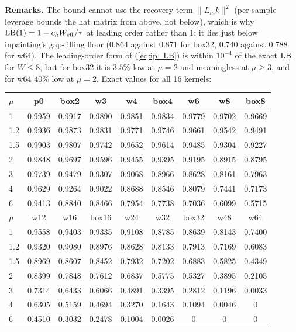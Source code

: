 \documentclass{article}
\numberwithin{equation}{section}   %
\begin{document}
{\bf Remarks.}  The bound cannot use the recovery term $\|L_mk\|^2$ (per-sample leverage bounds the hat
matrix from above, not below), which is why ${\rm LB}(1) = 1 - c_h W_{\rm eff}/\tau$ at leading order
rather than 1; it lies just below inpainting's gap-filling floor ($0.864$ against $0.871$ for box32,
$0.740$ against $0.788$ for w64).  The leading-order form of (\ref{eq:ip_LB}) is within $10^{-4}$ of the
exact ${\rm LB}$ for $W \le 8$, but for box32 it is $3.5\%$ low at $\mu = 2$ and meaningless at
$\mu \ge 3$, and for w64 $40\%$ low at $\mu = 2$.  Exact values for all 16 kernels:
\begin{center}\small
\begin{tabular}{lcccccccc}
\toprule
$\mu$ & p0 & box2 & w3 & w4 & box4 & w6 & w8 & box8 \\
\midrule
1   & 0.9959 & 0.9917 & 0.9890 & 0.9851 & 0.9834 & 0.9779 & 0.9702 & 0.9669 \\
1.2 & 0.9936 & 0.9873 & 0.9831 & 0.9771 & 0.9746 & 0.9661 & 0.9542 & 0.9491 \\
1.5 & 0.9903 & 0.9807 & 0.9742 & 0.9652 & 0.9614 & 0.9485 & 0.9304 & 0.9227 \\
2   & 0.9848 & 0.9697 & 0.9596 & 0.9455 & 0.9395 & 0.9195 & 0.8915 & 0.8795 \\
3   & 0.9739 & 0.9479 & 0.9307 & 0.9068 & 0.8966 & 0.8628 & 0.8161 & 0.7963 \\
4   & 0.9629 & 0.9264 & 0.9022 & 0.8688 & 0.8546 & 0.8079 & 0.7441 & 0.7173 \\
6   & 0.9413 & 0.8840 & 0.8466 & 0.7954 & 0.7738 & 0.7036 & 0.6099 & 0.5715 \\
\midrule
$\mu$ & w12 & w16 & box16 & w24 & w32 & box32 & w48 & w64 \\
\midrule
1   & 0.9558 & 0.9403 & 0.9335 & 0.9108 & 0.8785 & 0.8639 & 0.8143 & 0.7400 \\
1.2 & 0.9320 & 0.9080 & 0.8976 & 0.8628 & 0.8133 & 0.7913 & 0.7169 & 0.6083 \\
1.5 & 0.8969 & 0.8607 & 0.8452 & 0.7932 & 0.7202 & 0.6883 & 0.5825 & 0.4349 \\
2   & 0.8399 & 0.7848 & 0.7612 & 0.6837 & 0.5775 & 0.5327 & 0.3895 & 0.2105 \\
3   & 0.7314 & 0.6433 & 0.6066 & 0.4891 & 0.3395 & 0.2812 & 0.1196 & 0.0033 \\
4   & 0.6305 & 0.5159 & 0.4694 & 0.3270 & 0.1643 & 0.1094 & 0.0046 & 0 \\
6   & 0.4510 & 0.3032 & 0.2478 & 0.1004 & 0.0026 & 0 & 0 & 0 \\
\bottomrule
\end{tabular}
\end{center}
\end{document}
